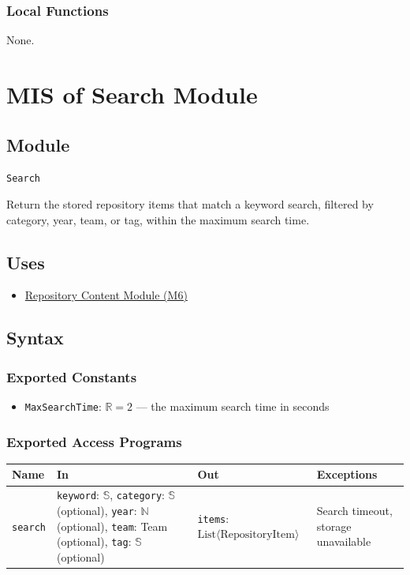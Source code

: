 \documentclass[12pt, titlepage]{article}
\begin{document}
\subsubsection{Local Functions}
None.

\newpage

\section{MIS of Search Module} \label{mSearch}

\subsection{Module}
\texttt{Search}

Return the stored repository items that match a keyword search, filtered by category, year, team, or tag, within the maximum search time.

\subsection{Uses}
\begin{itemize}
  \item \hyperref[mContent]{Repository Content Module (M6)}
\end{itemize}

\subsection{Syntax}

\subsubsection{Exported Constants}
\begin{itemize}
  \item \texttt{MaxSearchTime}: $\mathbb{R} = 2$ --- the maximum search time in seconds
\end{itemize}

\subsubsection{Exported Access Programs}
\begin{tabularx}{\textwidth}{p{2.7cm} p{5.5cm} p{4.2cm} X}
\toprule
\textbf{Name} & \textbf{In} & \textbf{Out} & \textbf{Exceptions} \\
\midrule
\texttt{search} & \texttt{keyword}: $\mathbb{S}$, \texttt{category}: $\mathbb{S}$ (optional), \texttt{year}: $\mathbb{N}$ (optional), \texttt{team}: Team (optional), \texttt{tag}: $\mathbb{S}$ (optional) & \texttt{items}: $\text{List}\langle \text{RepositoryItem} \rangle$ & Search timeout, storage unavailable \\
\bottomrule
\end{tabularx}
\end{document}
